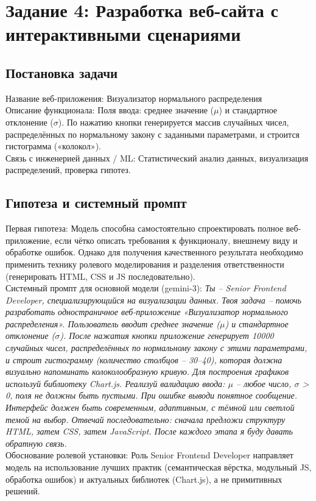 \newpage
\section*{Задание 4: Разработка веб-сайта с интерактивными сценариями}
\subsection{Постановка задачи}
\noindent
Название веб-приложения: Визуализатор нормального распределения \\
Описание функционала: Поля ввода: среднее значение ($\mu$) и стандартное отклонение ($\sigma$). По нажатию кнопки генерируется массив случайных чисел, распределённых по нормальному закону с заданными параметрами, и строится гистограмма («колокол»).\\
Связь с инженерией данных / ML: Статистический анализ данных, визуализация распределений, проверка гипотез.
\subsection{Гипотеза и системный промпт}
Первая гипотеза:
Модель способна самостоятельно спроектировать полное веб-приложение, если чётко описать требования к функционалу, внешнему виду и обработке ошибок.
Однако для получения качественного результата необходимо применить технику ролевого моделирования и разделения ответственности (генерировать HTML, CSS и JS последовательно).\\
\newline
\indent
Системный промпт для основной модели (gemini-3):
\textit{Ты – Senior Frontend Developer, специализирующийся на визуализации данных. Твоя задача – помочь разработать одностраничное веб-приложение «Визуализатор нормального распределения». Пользователь вводит среднее значение ($\mu$) и стандартное отклонение ($\sigma$). После нажатия кнопки приложение генерирует 10000 случайных чисел, распределённых по нормальному закону с этими параметрами, и строит гистограмму (количество столбцов – 30–40), которая должна визуально напоминать колоколообразную кривую. Для построения графиков используй библиотеку Chart.js. Реализуй валидацию ввода: $\mu$ – любое число, $\sigma$ > 0, поля не должны быть пустыми. При ошибке выводи понятное сообщение. Интерфейс должен быть современным, адаптивным, с тёмной или светлой темой на выбор. Отвечай последовательно: сначала предложи структуру HTML, затем CSS, затем JavaScript. После каждого этапа я буду давать обратную связь.}\\
\newline
\indent
Обоснование ролевой установки:
Роль Senior Frontend Developer направляет модель на использование лучших практик (семантическая вёрстка, модульный JS, обработка ошибок) и актуальных библиотек (Chart.js), а не примитивных решений. \\
